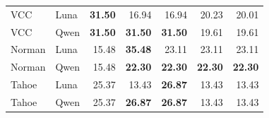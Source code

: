 \begin{table}[htbp]
\begin{tabularx}{\linewidth}{@{}Xlrrrrr@{}}
VCC & Luna & \textbf{31.50} & 16.94 & 16.94 & 20.23 & 20.01 \\
VCC & Qwen & \textbf{31.50} & \textbf{31.50} & \textbf{31.50} & 19.61 & 19.61 \\
Norman & Luna & 15.48 & \textbf{35.48} & 23.11 & 23.11 & 23.11 \\
Norman & Qwen & 15.48 & \textbf{22.30} & \textbf{22.30} & \textbf{22.30} & \textbf{22.30} \\
Tahoe & Luna & 25.37 & 13.43 & \textbf{26.87} & 13.43 & 13.43 \\
Tahoe & Qwen & 25.37 & \textbf{26.87} & \textbf{26.87} & 13.43 & 13.43 \\
\bottomrule
\end{tabularx}
\end{table}
